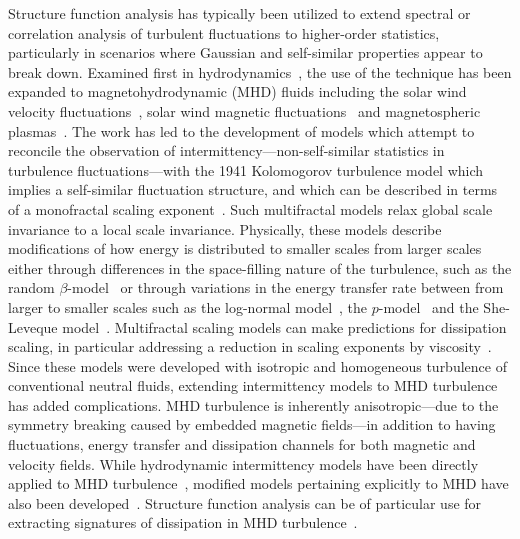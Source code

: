 \documentclass[aps,prl,amsmath,amssymb,reprint,superscriptaddress]{revtex4-1} %
\begin{document}
Structure function analysis has typically been utilized to extend spectral or correlation analysis of turbulent fluctuations to higher-order statistics, particularly in scenarios where Gaussian and self-similar properties appear to break down. Examined first in hydrodynamics~\cite{anselmet1984,frisch1995}, the use of the technique has been expanded to magnetohydrodynamic (MHD) fluids including the solar wind velocity fluctuations~\cite{burlaga1991}, solar wind magnetic fluctuations~\cite{burlaga1992,tu1995} and magnetospheric plasmas~\cite{consolini1996,hnat2003}. The work has led to the development of models which attempt to reconcile the observation of intermittency---non-self-similar statistics in turbulence fluctuations---with the 1941 Kolomogorov turbulence model which implies a self-similar fluctuation structure, and which can be described in terms of a monofractal scaling exponent~\cite{kolmogorov1941,frisch1995}. Such multifractal models relax global scale invariance to a local scale invariance. Physically, these models describe modifications of how energy is distributed to smaller scales from larger scales either through differences in the space-filling nature of the turbulence, such as the random $\beta$-model~\cite{benzi1984} or through variations in the energy transfer rate between from larger to smaller scales such as the log-normal model~\cite{kolmogorov1962}, the $p$-model~\cite{meneveau1987} and the She-Leveque model~\cite{she1994,dubrulle1994}. Multifractal scaling models can make predictions for dissipation scaling, in particular addressing a reduction in scaling exponents by viscosity~\cite{frisch1991,chevillard2005}. Since these models were developed with isotropic and homogeneous turbulence of conventional neutral fluids, extending intermittency models to MHD turbulence has added complications. MHD turbulence is inherently anisotropic---due to the symmetry breaking caused by embedded magnetic fields---in addition to having fluctuations, energy transfer and dissipation channels for both magnetic and velocity fields. While hydrodynamic intermittency models have been directly applied to MHD turbulence~\cite{burlaga1991,pagel2002}, modified models pertaining explicitly to MHD have also been developed~\cite{carbone1993,muller2000,biskamp2000,boldyrev2002,cho2003}. Structure function analysis can be of particular use for extracting signatures of dissipation in MHD turbulence~\cite{cho2003,alexandrova2008,kiyani2009,kiyani2013}.
\end{document}
